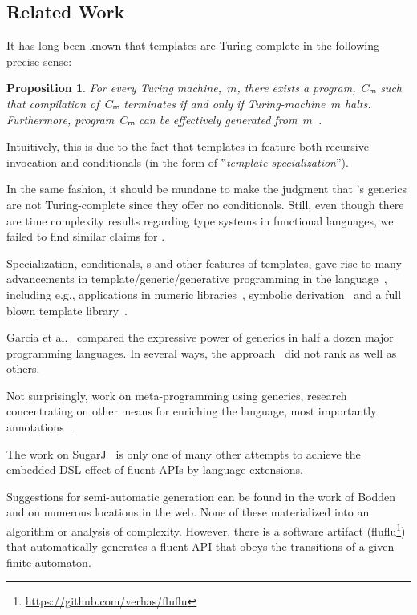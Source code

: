 \documentclass[a4paper,USenglish]{lipics-v2016}
\newcommand\kk[1]{\textcolor{RoyalBlue}{\text{\textup{\textbf{\texttt{#1}}}}}}
\newtheorem{Proposition}{Proposition}
\numberwithin{equation}{section}
\numberwithin{figure}{section}
\newcommand \urlref [1] {\footnote{\url{#1}}}
\begin{document}
\subsection{Related Work}

It has long been known
  that \CC templates are Turing complete in the following precise sense:

\begin{Proposition}
  \label{Theorem:Gutterman}
  For every Turing machine,~$m$, there exists a \CC program,~$Cₘ$ such that
    compilation of~$Cₘ$ terminates if and only if
      Turing-machine~$m$ halts.
      Furthermore, program~$Cₘ$ can be effectively generated from~$m$~\cite{Gutterman:2003}.
\end{Proposition}

Intuitively, this is due to the fact that templates in \CC
  feature both recursive invocation and conditionals (in the form of
  ‟\emph{template specialization}”).

In the same fashion, it should be mundane to make the judgment that
  \Java's generics are not Turing-complete since they offer no conditionals.
Still, even though there are time complexity results regarding type systems in functional
  languages, we failed to find similar claims for \Java.

Specialization, conditionals, \kk{typedef}s and other features of \CC templates,
  gave rise to many advancements in template/generic/generative programming
  in the language~\cite{Austern:98,Musser:Stepanov:1989,Backhouse:Jansson:1999,Dehnert:Stepanov:2000},
  including e.g., applications in numeric libraries~\cite{Veldhuizen:95,Vandevoorde:Josuttis:02},
  symbolic derivation~\cite{Gil:Gutterman:98}
  and a full blown template library~\cite{Abrahams:Gurtovoy:04}.

Garcia et al.~\cite{Garcia:Jarvi:Lumsdaine:Siek:Willcock:03} compared
  the expressive power of generics in half a dozen major programming languages.
  In several ways, the \Java approach~\cite{Bracha:Odersky:Stoutamire:Wadler:98}
  did not rank as well as others.

Not surprisingly, work on meta-programming using \Java generics,
  research concentrating on other means for enriching the language,
  most importantly annotations~\cite{Papi:08}.

The work on SugarJ~\cite{Erdweg:2011} is only one of many other attempts
  to achieve the embedded DSL effect of fluent APIs by language extensions.

Suggestions for semi-automatic generation can be found in the work of Bodden~\cite{Bodden:14} and
  on numerous locations in the web.
None of these materialized into an algorithm or analysis of complexity.
However, there is a software artifact (fluflu\urlref{https://github.com/verhas/fluflu})
  that automatically generates a fluent API that obeys the transitions
    of a given finite automaton.
 
\end{document}
